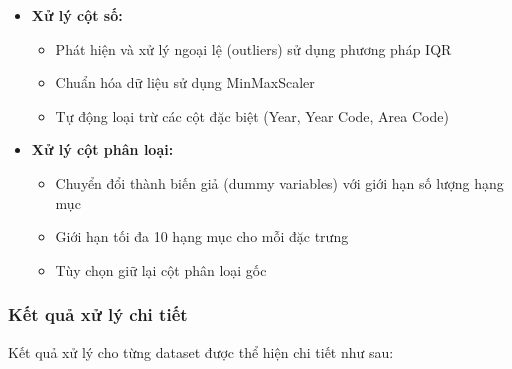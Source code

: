 \begin{itemize}
    \item \textbf{Xử lý cột số:}
    \begin{itemize}
        \item Phát hiện và xử lý ngoại lệ (outliers) sử dụng phương pháp IQR
        \item Chuẩn hóa dữ liệu sử dụng MinMaxScaler
        \item Tự động loại trừ các cột đặc biệt (Year, Year Code, Area Code)
    \end{itemize}
    
    \item \textbf{Xử lý cột phân loại:}
    \begin{itemize}
        \item Chuyển đổi thành biến giả (dummy variables) với giới hạn số lượng hạng mục
        \item Giới hạn tối đa 10 hạng mục cho mỗi đặc trưng
        \item Tùy chọn giữ lại cột phân loại gốc
    \end{itemize}
\end{itemize}

\subsubsection{Kết quả xử lý chi tiết}

\hspace{0.5cm}Kết quả xử lý cho từng dataset được thể hiện chi tiết như sau:

